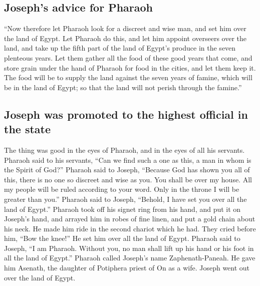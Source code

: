 \hypertarget{josephs-advice-for-pharaoh}{%
\subsection{Joseph's advice for
Pharaoh}\label{josephs-advice-for-pharaoh}}

 ``Now therefore let Pharaoh look for a discreet and wise
man, and set him over the land of Egypt.  Let Pharaoh do
this, and let him appoint overseers over the land, and take up the fifth
part of the land of Egypt's produce in the seven plenteous years.
 Let them gather all the food of these good years that
come, and store grain under the hand of Pharaoh for food in the cities,
and let them keep it.  The food will be to supply the
land against the seven years of famine, which will be in the land of
Egypt; so that the land will not perish through the famine.''

\hypertarget{joseph-was-promoted-to-the-highest-official-in-the-state}{%
\subsection{Joseph was promoted to the highest official in the
state}\label{joseph-was-promoted-to-the-highest-official-in-the-state}}

 The thing was good in the eyes of Pharaoh, and in the
eyes of all his servants.  Pharaoh said to his servants,
``Can we find such a one as this, a man in whom is the Spirit of God?''
 Pharaoh said to Joseph, ``Because God has shown you all
of this, there is no one so discreet and wise as you. 
You shall be over my house. All my people will be ruled according to
your word. Only in the throne I will be greater than you.''
 Pharaoh said to Joseph, ``Behold, I have set you over
all the land of Egypt.''  Pharaoh took off his signet
ring from his hand, and put it on Joseph's hand, and arrayed him in
robes of fine linen, and put a gold chain about his neck.
 He made him ride in the second chariot which he had.
They cried before him, ``Bow the knee!'' He set him over all the land of
Egypt.  Pharaoh said to Joseph, ``I am Pharaoh. Without
you, no man shall lift up his hand or his foot in all the land of
Egypt.''  Pharaoh called Joseph's name Zaphenath-Paneah.
He gave him Asenath, the daughter of Potiphera priest of On as a wife.
Joseph went out over the land of Egypt.

